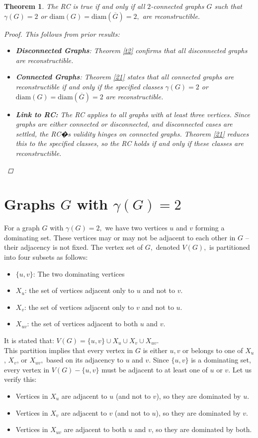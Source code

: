 \documentclass[11pt,oneside]{article}
\newtheorem{thm}{Theorem}
\theoremstyle{definition}
\begin{document}
\begin{thm}
The RC is true if and only if all $2$-connected graphs $G$ such that $\gamma(G)=2$ or $\text{diam}(G)=\text{diam}(\overline{G})=2,$ are reconstructible.
\begin{proof}

This follows from prior results:
\begin{itemize}
        \item {\bf Disconnected Graphs}: Theorem \ref{t2} confirms that all disconnected graphs are reconstructible.
        \item  {\bf Connected Graphs}: Theorem \ref{21} states that all connected graphs are reconstructible if and only if the specified classes $\gamma(G)=2$ or $\text{diam}(G)=\text{diam}(\overline{G})=2$ are reconstructible.
        \item {\bf Link to RC:} The RC applies to all graphs with at least three vertices. Since graphs are either connected or disconnected, and disconnected cases are settled, the RC�s validity hinges on connected graphs. Theorem \ref{21} reduces this to the specified classes, so the RC holds if and only if these classes are reconstructible. \end{itemize} \end{proof} \end{thm} 

\section{Graphs $G$ with $\gamma(G)=2$}
\indent \indent For a graph $G$ with $\gamma(G)=2,$ we have two vertices $u$ and $v$ forming a dominating set. These vertices may or may not be adjacent to each other in $G$ -- their adjacency is not fixed. The vertex set of $G,$ denoted $V(G),$ is partitioned into four subsets as follows:
\begin{itemize}
\item $\{u,v\}$: The two dominating vertices
\item $X_u$: the set of vertices adjacent only to $u$ and not to $v.$
\item $X_v$: the set of vertices adjacent only to $v$ and not to $u.$
\item $X_{uv}$: the set of vertices adjacent to both $u$ and $v.$
\end{itemize}
It is stated that: $V(G)=\{u,v\} \cup X_u \cup X_v \cup X_{uv}.$\\
This partition implies that every vertex in  $G$ is either $u,v$ or belongs to one of $X_u$, $X_v$, or $X_{uv},$ based on its adjacency to $u$ and $v.$ Since $\{u,v\}$ is a dominating set, every vertex in $V(G)-\{u,v\}$ must be adjacent to at least one of $u$ or $v$. Let us verify this:
\begin{itemize}
\item Vertices in $X_u$ are adjacent to $u$ (and not to $v$), so they are dominated by $u.$
\item Vertices in $X_v$ are adjacent to $v$ (and not to $u$), so they are dominated by $v.$
\item Vertices in $X_{uv}$ are adjacent to both $u$ and $v$, so they are dominated by both. 
\end{itemize}
\end{document}

